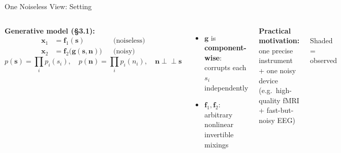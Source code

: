 \documentclass[aspectratio=169, 10pt]{beamer}
\begin{document}
\begin{frame}{One Noiseless View: Setting}
  \begin{columns}[T]
      \textbf{Generative model (§3.1):}
      \begin{align*}
        \mathbf{x}_1 &= \mathbf{f}_1(\mathbf{s}) & &\text{(noiseless)}\\
        \mathbf{x}_2 &= \mathbf{f}_2\!\bigl(\mathbf{g}(\mathbf{s},\mathbf{n})\bigr) & &\text{(noisy)}
      \end{align*}
      \[
        p(\mathbf{s})=\prod_i p_i(s_i),\quad
        p(\mathbf{n})=\prod_i p_i(n_i),\quad
        \mathbf{n}\perp\!\!\!\perp\mathbf{s}
      \]

      \bigskip
      \begin{itemize}
        \item $\mathbf{g}$ is \textbf{component-wise}: corrupts each $s_i$ independently
        \item $\mathbf{f}_1,\mathbf{f}_2$: arbitrary nonlinear invertible mixings
      \end{itemize}

      \bigskip
      \textbf{Practical motivation:}\\
      one precise instrument + one noisy device\\
      (e.g.\ high-quality fMRI + fast-but-noisy EEG)

      \centering\vspace{1em}
      \\[0.5em]
      \small Shaded = observed
  \end{columns}
\end{frame}
\end{document}
